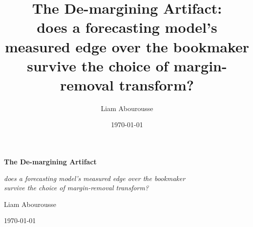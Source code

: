 \documentclass[11pt,a4paper]{article}
\title{The De-margining Artifact:\\
does a forecasting model's measured edge over the bookmaker\\
survive the choice of margin-removal transform?}
\author{Liam Abourousse}
\date{\today}
\begin{document}
\raggedbottom

\begin{titlepage}
  \centering
  \vspace*{\fill}
  {\LARGE\bfseries The De-margining Artifact\par}
  \vspace{1.2em}
  {\large\itshape does a forecasting model's measured edge over the bookmaker\\
   survive the choice of margin-removal transform?\par}
  \vspace{3em}
  {\large Liam Abourousse\par}
  \vspace{0.8em}
  {\large\today\par}
  \vspace*{\fill}
\end{titlepage}
\setcounter{page}{2}
\end{document}
